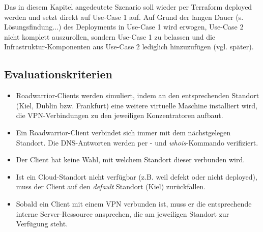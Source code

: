 Das in diesem Kapitel angedeutete Szenario soll wieder per Terraform deployed werden und setzt direkt auf Use-Case 1 auf. Auf Grund der langen Dauer (s. Lösungsfindung...) des Deployments in Use-Case 1 wird erwogen, Use-Case 2 nicht \glqq komplett\grqq{} auszurollen, sondern Use-Case 1 zu belassen und die Infrastruktur-Komponenten aus Use-Case 2 lediglich hinzuzufügen (vgl. später).
%
\subsection{Evaluationskriterien}
\begin{itemize}
\item Roadwarrior-Clients werden simuliert, indem an den entsprechenden Standort (Kiel, Dublin bzw. Frankfurt) eine weitere virtuelle Maschine installiert wird, die VPN-Verbindungen zu den jeweiligen Konzentratoren aufbaut.
\item Ein Roadwarrior-Client verbindet sich immer mit dem nächstgelegen Standort. Die DNS-Antworten werden per - und \textit{whois}-Kommando verifiziert.
\item Der Client hat keine Wahl, mit welchem Standort dieser verbunden wird.
\item Ist ein Cloud-Standort nicht verfügbar (z.B. weil defekt oder nicht deployed), muss der Client auf den \textit{default} Standort (Kiel) zurückfallen.
\item Sobald ein Client mit einem VPN verbunden ist, muss er die entsprechende interne Server-Ressource ansprechen, die am jeweiligen Standort zur Verfügung steht.
\end{itemize}
